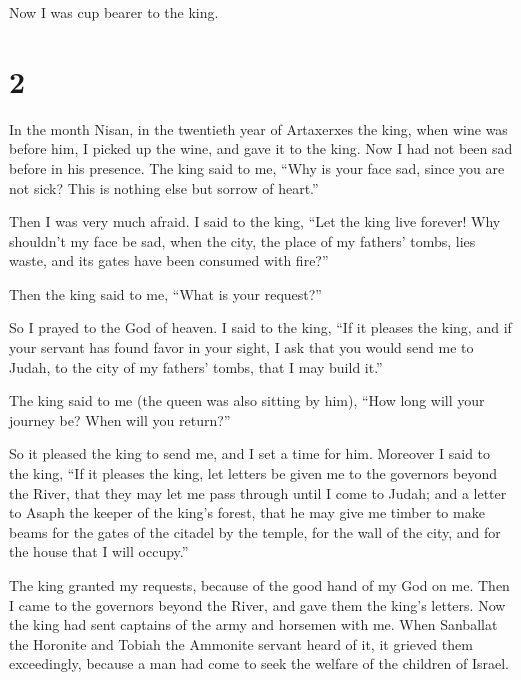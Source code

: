 Now I was cup bearer to the king.

\hypertarget{section-1}{%
\section{2}\label{section-1}}

 In the month Nisan, in the twentieth year of Artaxerxes
the king, when wine was before him, I picked up the wine, and gave it to
the king. Now I had not been sad before in his presence. 
The king said to me, ``Why is your face sad, since you are not sick?
This is nothing else but sorrow of heart.''

Then I was very much afraid.  I said to the king, ``Let
the king live forever! Why shouldn't my face be sad, when the city, the
place of my fathers' tombs, lies waste, and its gates have been consumed
with fire?''

 Then the king said to me, ``What is your request?''

So I prayed to the God of heaven.  I said to the king,
``If it pleases the king, and if your servant has found favor in your
sight, I ask that you would send me to Judah, to the city of my fathers'
tombs, that I may build it.''

 The king said to me (the queen was also sitting by him),
``How long will your journey be? When will you return?''

So it pleased the king to send me, and I set a time for him.
 Moreover I said to the king, ``If it pleases the king,
let letters be given me to the governors beyond the River, that they may
let me pass through until I come to Judah;  and a letter
to Asaph the keeper of the king's forest, that he may give me timber to
make beams for the gates of the citadel by the temple, for the wall of
the city, and for the house that I will occupy.''

The king granted my requests, because of the good hand of my God on me.
 Then I came to the governors beyond the River, and gave
them the king's letters. Now the king had sent captains of the army and
horsemen with me.  When Sanballat the Horonite and Tobiah
the Ammonite servant heard of it, it grieved them exceedingly, because a
man had come to seek the welfare of the children of Israel.


